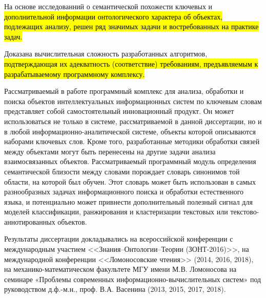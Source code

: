 На основе исследованний о семантической похожести ключевых и \hl{дополнительной информации онтологического характера об объектах, подлежащих анализу, решен ряд значимых задачи и востребованных на практике задач.}

Доказана вычислительная сложность разработанных алгоритмов, \hl{подтверждающая их адекватность (соответствие) требованиям, предъявляемым к разрабатываемому программному комплексу.}

{\influence} Рассматриваемый в работе программный комплекс для анализа, обработки и поиска объектов интеллектуальных информационных систем по ключевым словам представляет собой самостоятельный инновационный продукт. Он может использоваться не только в системе, рассматриваемой в данной диссертации, но и в любой информационно-аналитической системе, объекты которой описываются наборами ключевых слов. Кроме того, разработанные методики обработки связей между объектами могут быть перенесены на другие задачи анализа взаимосвязанных объектов. Рассматриваемый программный модуль определения семантической близости между словами  порождает словарь синонимов той области, на которой был обучен. Этот словарь может быть использован в самых разнообразных задачах информационного поиска и обработки естественного языка, и потенциально может привнести дополнительный полезный сигнал для моделей классификации, ранжирования и кластеризации текстовых или текстово-аннотированных объектов.


{\probation} Результаты диссертации докладывались на всероссийской конференции с международным участием <<Знания–Онтологии–Теории (ЗОНТ-2016)>>, на международной конференции <<Ломоносовские чтения>> (2014, 2016, 2018),  на механико-математическом факультете МГУ имени М.В. Ломоносова на семинаре «Проблемы современных информационно-вычислительных систем» под руководством д.ф.-м.н., проф. В.А. Васенина (2013, 2015, 2017, 2018).


